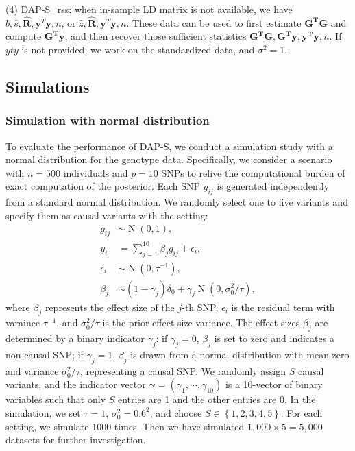 \documentclass[pdflatex,sn-mathphys-num]{sn-jnl}%
\theoremstyle{thmstyleone}%
\theoremstyle{thmstyletwo}%
\theoremstyle{thmstylethree}%
\begin{document}
(4) DAP-S\_rss: when in-sample LD matrix is not available, we have $\hat{b}, \hat{s}, \hat{\mathbf{R}}, \mathbf{y}^T\mathbf{y}, n$, or $\hat{z}, \hat{\mathbf{R}}, \mathbf{y}^T\mathbf{y}, n$. These data can be used to first estimate $\mathbf{G^TG}$ and compute $\mathbf{G^Ty}$, and then recover those sufficient statistics $\mathbf{G^TG}, \mathbf{G^Ty}, \mathbf{y^Ty}, n$. If $yty$ is not provided, we work on the standardized data, and $\sigma^2 = 1$.








\subsection{Simulations}\label{subsec2}
\subsubsection{Simulation with normal distribution}
To evaluate the performance of DAP-S, we conduct a simulation study with a normal distribution for the genotype data. Specifically, we consider a scenario with $n=500$ individuals and $p=10$ SNPs to relive the computational burden of exact computation of the posterior. Each SNP $g_{ij}$ is generated independently from a standard normal distribution. We randomly select one to five variants and specify them as causal variants with the setting:
\begin{align}
    g_{ij} &\sim \operatorname{N}\left(0,1\right),\\
    y_i &= \sum_{j=1}^{10} \beta_j g_{ij}  + \epsilon_i,\\
    \epsilon_i &\sim \operatorname{N}(0, \tau^{-1}),\\
    \beta_j  &\sim (1-\gamma_j)\delta_0 + \gamma_j\operatorname{N}\left(0, \sigma^2_{0}/\tau\right),
\end{align}
where $\beta_j$ represents the effect size of the $j$-th SNP, $\epsilon_i$ is the residual term with varaince $\tau^{-1}$, and $\sigma_0^2/\tau$ is the prior effect size variance. The effect sizes $\beta_j$ are determined by a binary indicator $\gamma_j$: if $\gamma_j=0$, $\beta_j$ is set to zero and indicates a non-causal SNP; if $\gamma_j=1$, $\beta_j$ is drawn from a normal distribution with mean zero and variance $\sigma^2_0/\tau$, representing a causal SNP. We randomly assign $S$ causal variants, and the indicator vector $\boldsymbol{\gamma} = \left(\gamma_1,\cdots,\gamma_{10}\right)$ is a 10-vector of binary variables such that only $S$ entries are 1 and the other entries are 0. In the simulation, we set $\tau=1$, $\sigma^2_0 = 0.6^2$, and choose $S \in \left\{1,2,3,4,5\right\}$. For each setting, we simulate 1000 times. Then we have simulated $1,000\times 5 = 5,000$ datasets for further investigation.
\end{document}
